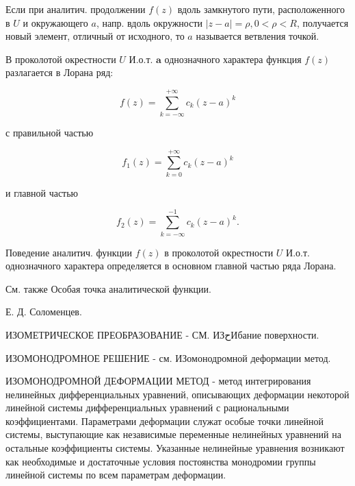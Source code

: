\documentclass[10pt]{article}
\begin{document}
Если при аналитич. продолжении $f(z)$ вдоль замкнутого пути, расположенного в $U$ и окружающего $a$, напр. вдоль окружности $|z-a|=\rho, 0<\rho<R$, получается новый элемент, отличный от исходного, то $a$ называется ветвления точкой.



В проколотой окрестности $U$ И.о.т. $\boldsymbol{a}$ однозначного характера функция $f(z)$ разлагается в Лорана ряд:



\[

f(z)=\sum_{k=-\infty}^{+\infty} c_{k}(z-a)^{k}

\]



с правильной частью



\[

f_{1}(z)=\sum_{k=0}^{+\infty} c_{k}(z-a)^{k}

\]



и главной частью



\[

f_{2}(z)=\sum_{k=-\infty}^{-1} c_{k}(z-a)^{k} .

\]



Поведение аналитич. функции $f(z)$ в проколотой окрестности $U$ И.о.т. однозначного характера определяется в основном главной частью ряда Лорана.



См. также Особая точка аналитической функции.



Е. Д. Соломенцев.



ИЗОМЕТРИЧЕСКОЕ ПРЕОБРАЗОВАНИЕ - СМ. ИЗحИбание поверхности.



ИЗОМОНОДРОМНОЕ РЕШЕНИЕ - см. ИЗомонодромной деформации метод.



ИЗОМОНОДРОМНОЙ ДЕФОРМАЦИИ МЕТОД - метод интегрирования нелинейных дифференциальных уравнений, описывающих деформации некоторой линейной системы дифференциальных уравнений с рациональными коэффициентами. Параметрами деформации служат особые точки линейной системы, выступающие как независимые переменные нелинейных уравнений на остальные коэффициенты системы. Указанные нелинейные уравнения возникают как необходимые и достаточные условия постоянства монодромии группы линейной системы по всем параметрам деформации.
\end{document}

